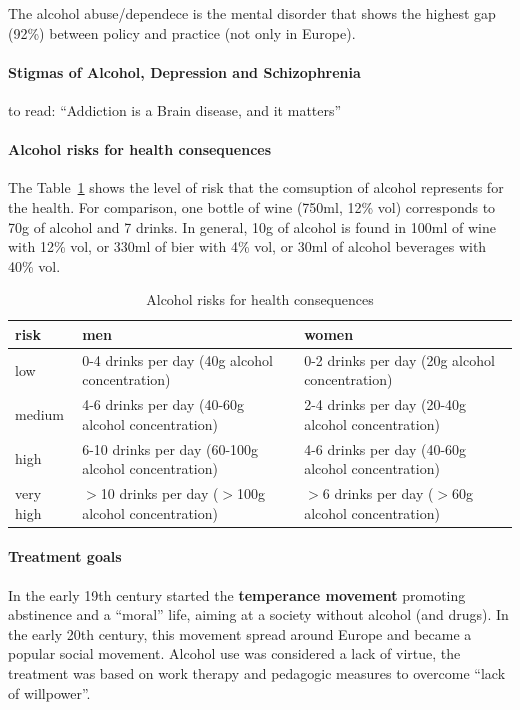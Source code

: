 \documentclass[12pt,article,oneside,a4paper]{memoir}
\begin{document}
The alcohol abuse/dependece is the mental disorder that shows the highest gap (92\%) between policy and practice (not only in Europe).

\paragraph{Stigmas of Alcohol, Depression and Schizophrenia}
 to read: ``Addiction is a Brain disease, and it matters''

\paragraph{Alcohol risks for health consequences} 

The Table~\ref{table:alcohol-risks} shows the level of risk that the comsuption of alcohol represents for the health. For comparison, one bottle of wine (750ml, 12\% vol) corresponds to 70g of alcohol and 7 drinks. In general, 10g of alcohol is found in 100ml of wine with 12\% vol, or 330ml of bier with 4\% vol, or 30ml of alcohol beverages with 40\% vol.

\begin{table}
  \begin{tabular}{ p{4cm} | p{5cm} | p{5cm} }
    \hline
    risk & men & women \\ \hline
	\hline
    low & 0-4 drinks per day (40g alcohol concentration) & 0-2 drinks per day (20g alcohol concentration) \\ \hline
    medium & 4-6 drinks per day (40-60g alcohol concentration) & 2-4 drinks per day (20-40g alcohol concentration) \\ \hline
    high & 6-10 drinks per day (60-100g alcohol concentration) & 4-6 drinks per day (40-60g alcohol concentration) \\ \hline
    very high & $>$10 drinks per day ($>$100g alcohol concentration) & $>$6 drinks per day ($>$60g alcohol concentration) \\ 
    \hline
  \end{tabular}
  \caption{Alcohol risks for health consequences}
  \label{table:alcohol-risks}
\end{table}

\paragraph{Treatment goals} 
In the early 19th century started the \textbf{temperance movement} promoting abstinence and a ``moral'' life, aiming at a society without alcohol (and drugs). In the early 20th century, this movement spread around Europe and became a popular social movement. Alcohol use was considered a lack of virtue, the treatment was based on work therapy and pedagogic measures to overcome ``lack of willpower''.
\end{document}
